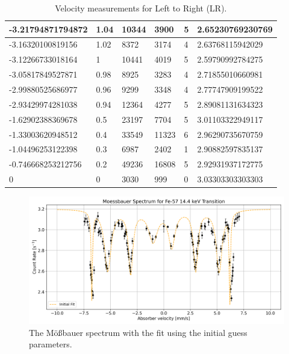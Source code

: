 \documentclass[a4paper]{report}
\numberwithin{equation}{section}
\begin{document}
\begin{table}[!ht]
\begin{tabular}{|l|l|l|l|l|l|}
        -3.21794871794872 & 1.04 & 10344 & 3900 & 5 & 2.65230769230769 \\ \hline
        -3.16320100819156 & 1.02 & 8372 & 3174 & 4 & 2.63768115942029 \\ \hline
        -3.12266733018164 & 1 & 10441 & 4019 & 5 & 2.59790992784275 \\ \hline
        -3.05817849527871 & 0.98 & 8925 & 3283 & 4 & 2.71855010660981 \\ \hline
        -2.99880525686977 & 0.96 & 9299 & 3348 & 4 & 2.77747909199522 \\ \hline
        -2.93429974281038 & 0.94 & 12364 & 4277 & 5 & 2.89081131634323 \\ \hline
        -1.62902388369678 & 0.5 & 23197 & 7704 & 5 & 3.01103322949117 \\ \hline
        -1.33003620948512 & 0.4 & 33549 & 11323 & 6 & 2.96290735670759 \\ \hline
        -1.04496253122398 & 0.3 & 6987 & 2402 & 1 & 2.90882597835137 \\ \hline
        -0.746668253212756 & 0.2 & 49236 & 16808 & 5 & 2.92931937172775 \\ \hline
        0 & 0 & 3030 & 999 & 0 & 3.03303303303303 \\ \hline
    \end{tabular}
    \caption{Velocity measurements for Left to Right (LR).}
\end{table}


\begin{figure}[htb!]
	\centering
	\includegraphics[width=0.8\columnwidth]{moess_spect_init.png}
	\caption{The M\"o{\ss}bauer spectrum with the fit using the initial guess parameters.}
	\label{fig:moess_spect_init}
\end{figure}

\end{document}
